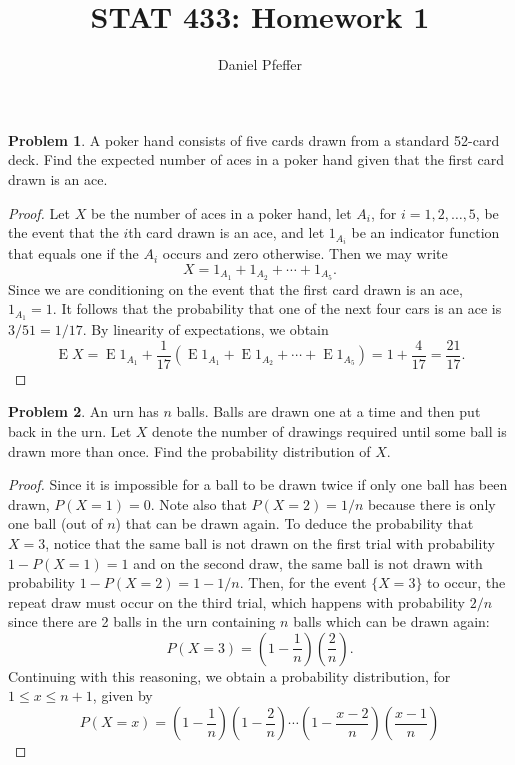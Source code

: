 \documentclass[oneside,reqno]{amsart}
\title{STAT 433: Homework 1}
\author{Daniel Pfeffer}
\DeclareMathOperator{\E}{\mathrm{E}}
\theoremstyle{definition}
\newtheorem{prob}{Problem}
\begin{document}
\maketitle


\begin{prob}
A poker hand consists of five cards drawn from a standard 52-card deck. Find the expected number of aces in a poker hand given that the first card drawn is an ace.
\end{prob}


\begin{proof}
Let $X$ be the number of aces in a poker hand, let $A_i$, for $i=1,2,\dotsc,5$, be the event that the $i$th card drawn is an ace, and let $1_{A_i}$ be an indicator function that equals one if the $A_i$ occurs and zero otherwise. Then we may write
\[
	X = 1_{A_1} + 1_{A_2} + \cdots + 1_{A_5}.
\]
Since we are conditioning on the event that the first card drawn is an ace, $1_{A_1} = 1$. It follows that the probability that one of the next four cars is an ace is $3/51 = 1/17$. By linearity of expectations, we obtain
\[
	\E X = \E 1_{A_1}  + \frac{1}{17} (\E 1_{A_1} + \E  1_{A_2} + \cdots + \E 1_{A_5})   
	= 1 + \frac{4}{17} 
	= \frac{21}{17}.
\]
\end{proof}


\begin{prob}
An urn has $n$ balls. Balls are drawn one at a time and then put back in the urn. Let $X$ denote the number of drawings required until some ball is drawn more than once. Find the probability distribution of $X$.
\end{prob}

\begin{proof}
Since it is impossible for a ball to be drawn twice if only one ball has been drawn, $P(X=1) = 0$. Note also that $P(X=2) = 1/n$ because there is only one ball (out of $n$) that can be drawn again. To deduce the probability that $X=3$, notice that the same ball is not drawn on the first trial with probability $1-P(X=1) = 1$ and on the second draw, the same ball is not drawn with probability $1-P(X=2) = 1-1/n$. Then, for the event $\{X=3\}$ to occur, the repeat draw must occur on the third trial, which happens with probability $2/n$ since there are 2 balls in the urn containing $n$ balls which can be drawn again:
\[
	P(X=3) =\left(1 - \frac{1}{n}\right)\left( \frac{2}{n}\right).
\]
Continuing with this reasoning, we obtain a probability distribution, for $1 \leq x \leq n+1$, given by
\[
	P(X=x) =\left(1-\frac{1}{n}\right)\left(1-\frac{2}{n}\right) \cdots\left(1-\frac{x-2}{n}\right) \left(\frac{x-1}{n}\right)
\]
\end{proof}
\end{document}
